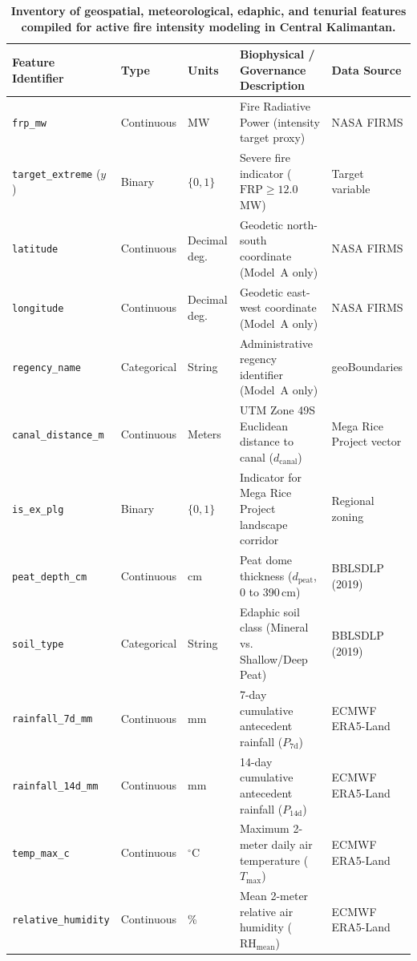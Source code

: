 \begin{table}[htbp]
\centering
\caption{\textbf{Inventory of geospatial, meteorological, edaphic, and tenurial features compiled for active fire intensity modeling in Central Kalimantan.}}
\label{tab:feature_inventory}
\small
\begin{tabularx}{\textwidth}{lllLP{3.0cm}}
\toprule
\textbf{Feature Identifier} & \textbf{Type} & \textbf{Units} & \textbf{Biophysical / Governance Description} & \textbf{Data Source} \\
\midrule
\texttt{frp\_mw} & Continuous & MW & Fire Radiative Power (intensity target proxy) & NASA FIRMS \\
\texttt{target\_extreme} ($y$) & Binary & $\{0, 1\}$ & Severe fire indicator ($\text{FRP} \ge 12.0$\,MW) & Target variable \\
\texttt{latitude} & Continuous & Decimal deg. & Geodetic north-south coordinate (Model~A only) & NASA FIRMS \\
\texttt{longitude} & Continuous & Decimal deg. & Geodetic east-west coordinate (Model~A only) & NASA FIRMS \\
\texttt{regency\_name} & Categorical & String & Administrative regency identifier (Model~A only) & geoBoundaries \\
\texttt{canal\_distance\_m} & Continuous & Meters & UTM Zone 49S Euclidean distance to canal ($d_{\text{canal}}$) & Mega Rice Project vector \\
\texttt{is\_ex\_plg} & Binary & $\{0, 1\}$ & Indicator for Mega Rice Project landscape corridor & Regional zoning \\
\texttt{peat\_depth\_cm} & Continuous & cm & Peat dome thickness ($d_{\text{peat}}$, 0 to 390\,cm) & BBLSDLP (2019) \\
\texttt{soil\_type} & Categorical & String & Edaphic soil class (Mineral vs. Shallow/Deep Peat) & BBLSDLP (2019) \\
\texttt{rainfall\_7d\_mm} & Continuous & mm & 7-day cumulative antecedent rainfall ($P_{\text{7d}}$) & ECMWF ERA5-Land \\
\texttt{rainfall\_14d\_mm} & Continuous & mm & 14-day cumulative antecedent rainfall ($P_{\text{14d}}$) & ECMWF ERA5-Land \\
\texttt{temp\_max\_c} & Continuous & $^\circ\text{C}$ & Maximum 2-meter daily air temperature ($T_{\text{max}}$) & ECMWF ERA5-Land \\
\texttt{relative\_humidity} & Continuous & \% & Mean 2-meter relative air humidity ($\text{RH}_{\text{mean}}$) & ECMWF ERA5-Land \\

\end{tabularx}
\end{table}
